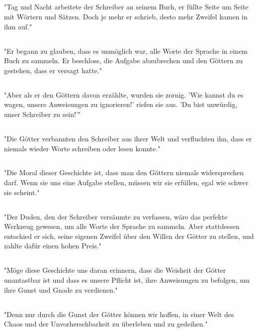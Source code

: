 \documentclass{article}
\begin{document}
\subsection{}
"Tag und Nacht arbeitete der Schreiber an seinem Buch, er füllte Seite um Seite mit Wörtern und Sätzen. Doch je mehr er schrieb, desto mehr Zweifel kamen in ihm auf."
\subsection{}
"Er begann zu glauben, dass es unmöglich war, alle Worte der Sprache in einem Buch zu sammeln. Er beschloss, die Aufgabe abzubrechen und den Göttern zu gestehen, dass er versagt hatte."
\subsection{}
"Aber als er den Göttern davon erzählte, wurden sie zornig. 'Wie kannst du es wagen, unsere Anweisungen zu ignorieren!' riefen sie aus. 'Du bist unwürdig, unser Schreiber zu sein!'"
\subsection{}
"Die Götter verbannten den Schreiber aus ihrer Welt und verfluchten ihn, dass er niemals wieder Worte schreiben oder lesen konnte."
\subsection{}
"Die Moral dieser Geschichte ist, dass man den Göttern niemals widersprechen darf. Wenn sie uns eine Aufgabe stellen, müssen wir sie erfüllen, egal wie schwer sie scheint."
\subsection{}
"Der Duden, den der Schreiber versäumte zu verfassen, wäre das perfekte Werkzeug gewesen, um alle Worte der Sprache zu sammeln. Aber stattdessen entschied er sich, seine eigenen Zweifel über den Willen der Götter zu stellen, und zahlte dafür einen hohen Preis."
\subsection{}
"Möge diese Geschichte uns daran erinnern, dass die Weisheit der Götter unantastbar ist und dass es unsere Pflicht ist, ihre Anweisungen zu befolgen, um ihre Gunst und Gnade zu verdienen."
\subsection{}
"Denn nur durch die Gunst der Götter können wir hoffen, in einer Welt des Chaos und der Unvorhersehbarkeit zu überleben und zu gedeihen."
\end{document}
